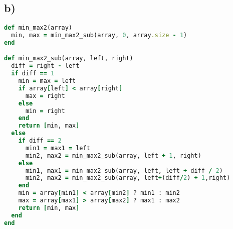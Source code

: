 \subsection*{b)}
\begin{lstlisting}[language=Ruby,numbers=right]
def min_max2(array)
  min, max = min_max2_sub(array, 0, array.size - 1)
end

def min_max2_sub(array, left, right)
  diff = right - left
  if diff == 1
    min = max = left
    if array[left] < array[right]
      max = right
    else
      min = right
    end
    return [min, max]
  else
    if diff == 2
      min1 = max1 = left
      min2, max2 = min_max2_sub(array, left + 1, right)
    else
      min1, max1 = min_max2_sub(array, left, left + diff / 2)
      min2, max2 = min_max2_sub(array, left+(diff/2) + 1,right)
    end
    min = array[min1] < array[min2] ? min1 : min2
    max = array[max1] > array[max2] ? max1 : max2
    return [min, max]
  end
end  
\end{lstlisting}



